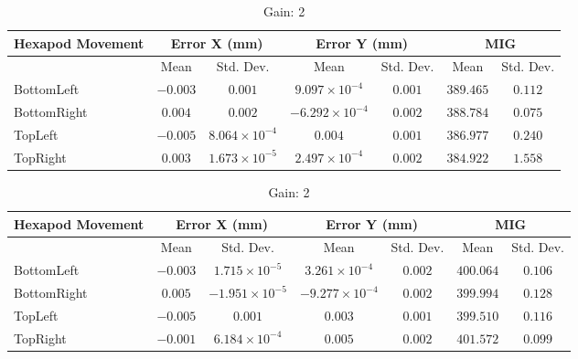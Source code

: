 \begin{table}[h]
    \centering
    \begin{subtable}{\textwidth}
        \centering
        \footnotesize
        \begin{tabular}{lcccccc}
            \toprule
            Hexapod Movement & \multicolumn{2}{c}{Error X (mm)} & \multicolumn{2}{c}{Error Y (mm)} & \multicolumn{2}{c}{MIG}  \\
            \midrule
            & \multicolumn{1}{c}{Mean} & \multicolumn{1}{c}{Std. Dev.} & \multicolumn{1}{c}{Mean} & \multicolumn{1}{c}{Std. Dev.} & \multicolumn{1}{c}{Mean} & \multicolumn{1}{c}{Std. Dev.} \\
            \midrule
            \textsf{BottomLeft} & $-0.003$ & $0.001$ & $9.097\times10^{-4}$ & $0.001$ & $389.465$ & $0.112$ \\
            \textsf{BottomRight} & $0.004$ & $0.002$ & $-6.292\times10^{-4}$ & $0.002$ & $388.784$ & $0.075$ \\
            \textsf{TopLeft} & $-0.005$ & $8.064\times10^{-4}$ & $0.004$ & $0.001$ & $386.977$ & $0.240$ \\
            \textsf{TopRight} & $0.003$ & $1.673\times10^{-5}$ & $2.497\times10^{-4}$ & $0.002$ & $384.922$ & $1.558$ \\
            \bottomrule
        \end{tabular}
        \caption{Gain: 0}
    \end{subtable}

    \vspace{10pt}

    \begin{subtable}{\textwidth}
        \centering
        \footnotesize
        \begin{tabular}{lcccccc}
            \toprule
            Hexapod Movement & \multicolumn{2}{c}{Error X (mm)} & \multicolumn{2}{c}{Error Y (mm)} & \multicolumn{2}{c}{MIG}  \\
            \midrule
            & \multicolumn{1}{c}{Mean} & \multicolumn{1}{c}{Std. Dev.} & \multicolumn{1}{c}{Mean} & \multicolumn{1}{c}{Std. Dev.} & \multicolumn{1}{c}{Mean} & \multicolumn{1}{c}{Std. Dev.} \\
            \midrule
            \textsf{BottomLeft} & $-0.003$ & $1.715\times10^{-5}$ & $3.261\times10^{-4}$ & $0.002$ & $400.064$ & $0.106$ \\
            \textsf{BottomRight} & $0.005$ & $-1.951\times10^{-5}$ & $-9.277\times10^{-4}$ & $0.002$ & $399.994$ & $0.128$ \\
            \textsf{TopLeft} & $-0.005$ & $0.001$ & $0.003$ & $0.001$ & $399.510$ & $0.116$ \\
            \textsf{TopRight} & $-0.001$ & $6.184\times10^{-4}$ & $0.005$ & $0.002$ & $401.572$ & $0.099$ \\
            \bottomrule
        \end{tabular}
        \caption{Gain: 2}
    \end{subtable}


\end{table}
